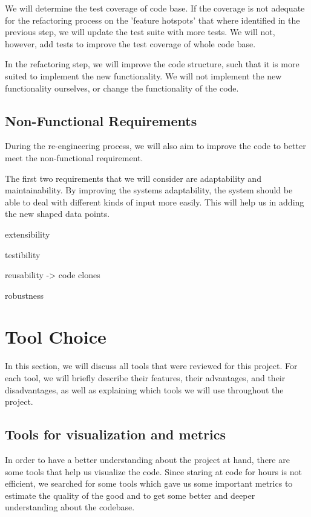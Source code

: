 \documentclass[]{article}
\begin{document}
We will determine the test coverage of code base. If the coverage is not adequate for the refactoring process on the 'feature hotspots' that where identified in the previous step, we will update the test suite with more tests. We will not, however, add tests to improve the test coverage of whole code base.

In the refactoring step, we will improve the code structure, such that it is more suited to implement the new functionality. We will not implement the new functionality ourselves, or change the functionality of the code. 

\subsection{Non-Functional Requirements}
During the re-engineering process, we will also aim to improve the code to better meet the non-functional requirement. 

The first two requirements that we will consider are adaptability and maintainability. By improving the systems adaptability, the system should be able to deal with different kinds of input more easily. This will help us in adding the new shaped data points. 

extensibility

testibility

reusability -> code clones

robustness

\section{Tool Choice}

In this section, we will discuss all tools that were reviewed for this project. For each tool, we will briefly describe their features, their advantages, and their disadvantages, as well as explaining which tools we will use throughout the project. 

\subsection{Tools for visualization and metrics}
In order to have a better understanding about the project at hand, there are some tools that help us visualize the code. Since staring at code for hours is not efficient, we searched for some tools which gave us some important metrics to estimate the quality of the good and to get some better and deeper understanding about the codebase.
\end{document}
